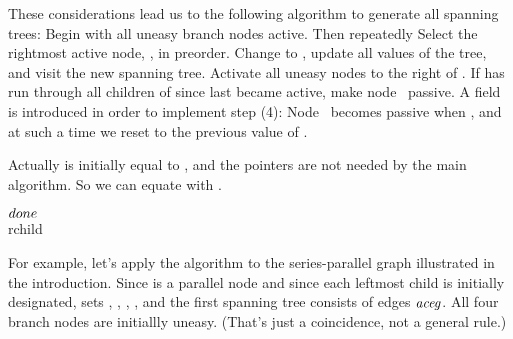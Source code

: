 These considerations lead us to the following algorithm to generate
all spanning trees: Begin with all uneasy branch nodes active. Then
repeatedly
\smallskip{} Select the rightmost active node, , in
preorder.
\smallskip{} Change  to , update all values
of the tree, and visit the new spanning tree.
\smallskip{} Activate all uneasy nodes to the right of .
\smallskip{} If  has run through all children of
since  last became active, make node~ passive.
\smallskip\noindent
A field  is introduced in order to implement step (4):
Node~
becomes passive when , and at such a time
we reset
 to the previous value of .

Actually  is initially equal to ,
and the 
pointers are not needed by the main algorithm. So we can equate
 with .

\Y\B\4\D$\\{done}$ \5
\\{rchild}\par
\fi

For example, let's apply the algorithm to the series-parallel graph
illustrated in the introduction. Since  is a parallel node and since
each leftmost child is initially designated,  sets
, , , , and the first spanning
tree consists of edges $\it aceg$. All four branch nodes are initiallly
uneasy. (That's just a coincidence, not a general rule.)

